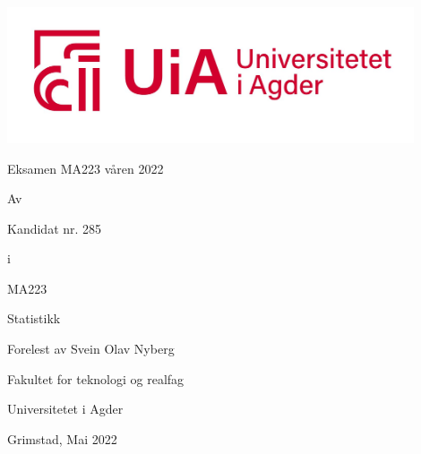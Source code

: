 \thispagestyle{empty}
\begin{center}
\vspace*{-2cm}
\includegraphics[width=120mm]{uia_logo.jpg}
\vspace{2cm}

{\LARGE Eksamen MA223 våren 2022}
\vspace{0.2cm}

Av
\vspace{0.5cm}

{\large Kandidat nr. 285}
\vspace{0.1cm}

i

\vspace{0.5cm}

MA223

Statistikk
\vspace{0.8cm}

Forelest av Svein Olav Nyberg
\vspace{0.2cm}

Fakultet for teknologi og realfag

Universitetet i Agder
\vspace{0.8cm}

{\large Grimstad, Mai 2022}

\end{center}

\vfill



\thispagestyle{empty}

\newpage